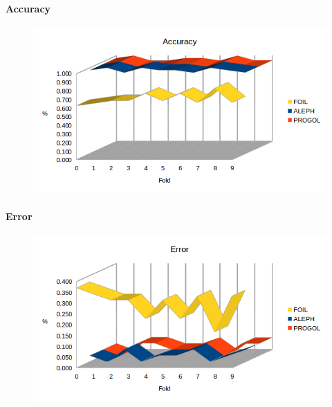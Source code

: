 \paragraph{Accuracy}
\begin{figure}[H]
	\includegraphics[width=1.1\textwidth]{img/datasetGraph/mlj/nodiscr/accuracy.png}
	\label{mljnodiscr-Accuracy}
\end{figure}
\paragraph{Error}
\begin{figure}[H]
	\includegraphics[width=1.1\textwidth]{img/datasetGraph/mlj/nodiscr/error.png}
	\label{mljnodiscr-Error}
\end{figure}
